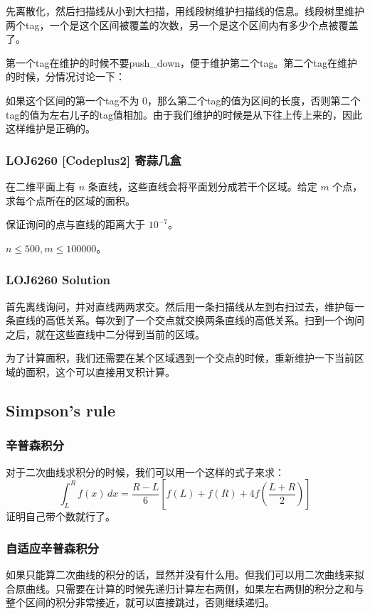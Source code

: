 \documentclass[10pt]{beamer}
\begin{document}
\begin{CJK}{UTF8}{gkai}
\begin{spacing}{1.2}
\begin{frame}
			先离散化，然后扫描线从小到大扫描，用线段树维护扫描线的信息。线段树里维护两个tag，一个是这个区间被覆盖的次数，另一个是这个区间内有多少个点被覆盖了。 \pause

			第一个tag在维护的时候不要push\_down，便于维护第二个tag。第二个tag在维护的时候，分情况讨论一下： \pause

			如果这个区间的第一个tag不为 $0$，那么第二个tag的值为区间的长度，否则第二个tag的值为左右儿子的tag值相加。由于我们维护的时候是从下往上传上来的，因此这样维护是正确的。

		\end{frame}
		\begin{frame}
			\frametitle{LOJ6260 [Codeplus2] 寄蒜几盒}

			在二维平面上有 $n$ 条直线，这些直线会将平面划分成若干个区域。给定 $m$ 个点，求每个点所在的区域的面积。

			保证询问的点与直线的距离大于 $10^{-7}$。

			$n \le 500,m \le 100000$。

		\end{frame}
		\begin{frame}
			\frametitle{LOJ6260 Solution}

			首先离线询问，并对直线两两求交。然后用一条扫描线从左到右扫过去，维护每一条直线的高低关系。每次到了一个交点就交换两条直线的高低关系。扫到一个询问之后，就在这些直线中二分得到当前的区域。 \pause

			为了计算面积，我们还需要在某个区域遇到一个交点的时候，重新维护一下当前区域的面积，这个可以直接用叉积计算。

		\end{frame}
		\subsection{Simpson's rule}
		\begin{frame}
			\frametitle{辛普森积分}

			对于二次曲线求积分的时候，我们可以用一个这样的式子来求： \pause
			$$ \int_{L}^{R} f(x)\,dx = \frac{R - L}{6}[f(L) + f(R) + 4f(\frac{L + R}{2})] $$
			证明自己带个数就行了。

		\end{frame}
		\begin{frame}
			\frametitle{自适应辛普森积分}

			如果只能算二次曲线的积分的话，显然并没有什么用。但我们可以用二次曲线来拟合原曲线。只需要在计算的时候先递归计算左右两侧，如果左右两侧的积分之和与整个区间的积分非常接近，就可以直接跳过，否则继续递归。 \pause


\end{frame}
\end{spacing}
\end{CJK}
\end{document}

